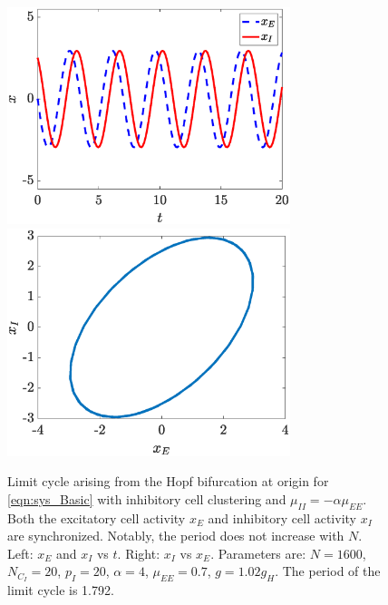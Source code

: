 \documentclass[reqno]{siamonline190516}
\begin{document}
\begin{figure}
    \centering
    \includegraphics[width=8.25cm]{limitcycleIC1.eps}\hspace{-0.5cm}
    \includegraphics[width=8.25cm]{limitcycleIC2.eps}
    \caption{Limit cycle arising from the Hopf bifurcation at origin for \cref{eqn:sys_Basic} with inhibitory cell clustering and $\mu_{II} = -\alpha \mu_{EE}$. Both the excitatory cell activity $x_E$ and inhibitory cell activity $x_I$ are synchronized. Notably, the period does not increase with $N$. Left: $x_E$ and $x_I$ vs $t$. Right: $x_I$ vs $x_E$. Parameters are: $N=1600$, $N_{C_I} = 20$, $p_I = 20$, $\alpha = 4$, $\mu_{EE}= 0.7$, $g = 1.02 g_H$. The period of the limit cycle is 1.792.} 
    \label{fig:limitcycleIC}
\end{figure}
\end{document}

